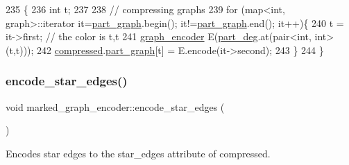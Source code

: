 \begin{DoxyCode}
235 \{
236   \textcolor{keywordtype}{int} t;
237 
238   \textcolor{comment}{// compressing graphs}
239   \textcolor{keywordflow}{for} (map<int, graph>::iterator it=\hyperlink{classmarked__graph__encoder_adbafd0769ae301acc1b2c19b5e1d4844}{part\_graph}.begin(); it!=\hyperlink{classmarked__graph__encoder_adbafd0769ae301acc1b2c19b5e1d4844}{part\_graph}.end(); it++)\{
240     t = it->first; \textcolor{comment}{// the color is t,t}
241     \hyperlink{classgraph__encoder}{graph\_encoder} E(\hyperlink{classmarked__graph__encoder_a55ea2edb2609dfc287432f61900d6ad1}{part\_deg}.at(pair<int, int>(t,t)));
242     \hyperlink{classmarked__graph__encoder_ac2ded200860fdd2321f86dd76b28bcb3}{compressed}.\hyperlink{classmarked__graph__compressed_ae179a4737e6eab905c18a94d44ef64b7}{part\_graph}[t] = E.encode(it->second);
243   \}
244 \}
\end{DoxyCode}
\mbox{\label{classmarked__graph__encoder_ad6883669a47d24e3d9898978f3252727}} 
\subsubsection{\texorpdfstring{encode\+\_\+star\+\_\+edges()}{encode\_star\_edges()}}
{\footnotesize\ttfamily void marked\+\_\+graph\+\_\+encoder\+::encode\+\_\+star\+\_\+edges (\begin{DoxyParamCaption}{ }\end{DoxyParamCaption})\hspace{0.3cm}{\ttfamily [private]}}



Encodes star edges to the star\+\_\+edges attribute of compressed. 


